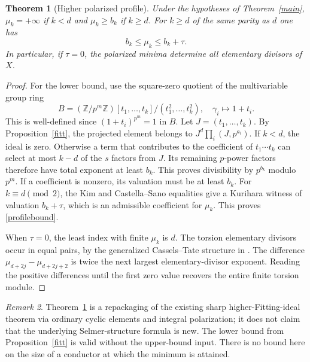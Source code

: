 \documentclass[11pt]{article}
\newtheorem{theorem}{Theorem}[section]
\theoremstyle{remark}\newtheorem{remark}[theorem]{Remark}
\newcommand{\Z}{\mathbb Z}\newcommand{\Q}{\mathbb Q}\newcommand{\F}{\mathbb F}
\begin{document}
\begin{theorem}[Higher polarized profile]\label{profile}
Under the hypotheses of Theorem~\ref{main}, $\mu_k=+\infty$ if $k<d$ and $\mu_k\geq b_k$ if $k\geq d$. For $k\geq d$ of the same parity as $d$ one has
\begin{equation}
 b_k\leq\mu_k\leq b_k+\tau.\label{profilebound}
\end{equation}
In particular, if $\tau=0$, the polarized minima determine all elementary divisors of $X$.
\end{theorem}
\begin{proof}
For the lower bound, use the square-zero quotient of the multivariable group ring
\[
 B=(\Z/p^m\Z)[t_1,\ldots,t_k]/(t_1^2,\ldots,t_k^2),\quad
 \gamma_i\mapsto1+t_i.
\]
This is well-defined since $(1+t_i)^{p^m}=1$ in $B$. Let $J=(t_1,\ldots,t_k)$. By Proposition~\ref{fitt}, the projected element belongs to $J^d\prod_i(J,p^{a_i})$. If $k<d$, the ideal is zero. Otherwise a term that contributes to the coefficient of $t_1\cdots t_k$ can select at most $k-d$ of the $s$ factors from $J$. Its remaining $p$-power factors therefore have total exponent at least $b_k$. This proves divisibility by $p^{b_k}$ modulo $p^m$. If a coefficient is nonzero, its valuation must be at least $b_k$. For $k\equiv d\pmod2$, the Kim and Castella--Sano equalities give a Kurihara witness of valuation $b_k+\tau$, which is an admissible coefficient for $\mu_k$. This proves \eqref{profilebound}.

When $\tau=0$, the least index with finite $\mu_k$ is $d$. The torsion elementary divisors occur in equal pairs, by the generalized Cassels--Tate structure in \cite[Thm.~1.8]{Kim}. The difference $\mu_{d+2j}-\mu_{d+2j+2}$ is twice the next largest elementary-divisor exponent. Reading the positive differences until the first zero value recovers the entire finite torsion module.
\end{proof}
\begin{remark}
Theorem~\ref{profile} is a repackaging of the existing sharp higher-Fitting-ideal theorem via ordinary cyclic elements and integral polarization; it does not claim that the underlying Selmer-structure formula is new. The lower bound from Proposition~\ref{fitt} is valid without the upper-bound input. There is no bound here on the size of a conductor at which the minimum is attained.
\end{remark}
\end{document}
